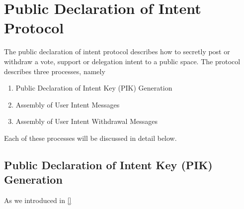 %
%
%
%
%


\section{Public Declaration of Intent Protocol}
\label{sec:PublicDeclarationOfIntentProtocol}
The public declaration of intent protocol describes how to secretly post or withdraw a vote, support or delegation intent to a public space.
The protocol describes three processes, namely
\begin{enumerate}
  \item Public Declaration of Intent Key (PIK) Generation
  \item Assembly of User Intent Messages
  \item Assembly of User Intent Withdrawal Messages
\end{enumerate}

Each of these processes will be discussed in detail below.

\subsection{Public Declaration of Intent Key (PIK) Generation}
As we introduced in \autoref{}

